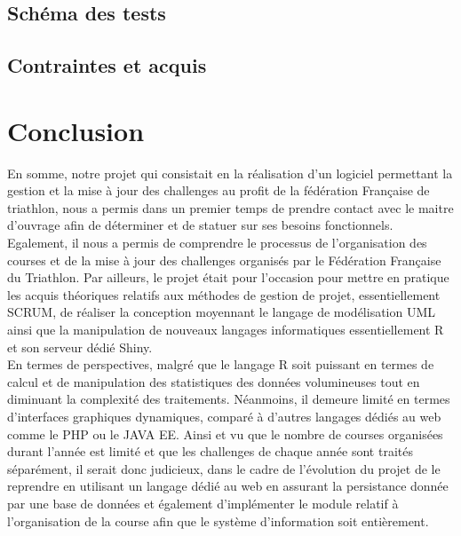 \documentclass[12pt,a4paper]{report}
\begin{document}
\subsection {Schéma des tests }

\subsection {Contraintes et acquis }
\newpage
\section* {Conclusion}
En somme, notre projet qui consistait en la réalisation d’un logiciel permettant  la gestion et la mise à jour des challenges au profit de la fédération Française de triathlon, nous a permis dans un premier temps de prendre contact avec le maitre d’ouvrage afin de  déterminer et de statuer sur ses besoins fonctionnels. Egalement, il nous a permis de comprendre le processus de l’organisation des courses et de la mise à jour des challenges organisés par le Fédération Française du Triathlon. Par ailleurs, le projet était pour l’occasion pour mettre en pratique les acquis théoriques relatifs aux méthodes de gestion de projet, essentiellement SCRUM, de réaliser la conception moyennant le langage de modélisation UML ainsi   que la manipulation de nouveaux langages informatiques essentiellement R et son serveur dédié Shiny.\\
En termes de perspectives, malgré que le langage R soit puissant en termes de calcul et de manipulation des statistiques des données volumineuses tout en diminuant la complexité des traitements. Néanmoins, il demeure limité en termes d’interfaces graphiques dynamiques, comparé à d’autres langages dédiés au web comme le PHP ou le JAVA EE. Ainsi et vu que le nombre de courses organisées durant l’année est limité et que les challenges de chaque année sont traités séparément, il serait donc judicieux, dans le cadre de l’évolution du projet de le reprendre en utilisant un langage dédié au web en assurant la persistance donnée par une base de données et également d’implémenter le module relatif à l’organisation de la course afin que le système d’information soit entièrement.




	
	
\end{document}
